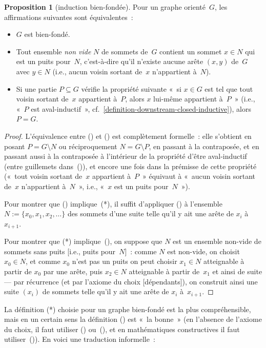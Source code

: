 \documentclass[12pt,a4paper]{article}
\theoremstyle{definition}
\newtheorem{prop}[comcnt]{Proposition}
\begin{document}
\begin{prop}[induction bien-fondée]\label{well-founded-induction}
Pour un graphe orienté $G$, les affirmations suivantes sont
équivalentes :

\begin{itemize}
\item[(*)]$G$ est bien-fondé.
\item[(\dag)]Tout ensemble \emph{non vide} $N$ de sommets de $G$
  contient un sommet $x \in N$ qui est un puits pour $N$,
  c'est-à-dire qu'il n'existe aucune arête $(x,y)$ de $G$ avec $y \in
  N$ (i.e., aucun voisin sortant de $x$ n'appartient à $N$).
\item[(\ddag)]Si une partie $P\subseteq G$ vérifie la propriété
  suivante « si $x \in G$ est tel que tout voisin sortant de $x$
    appartient à $P$, alors $x$ lui-même appartient à $P$ » (i.e.,
  « $P$ est aval-inductif »,
  cf. \ref{definition-downstream-closed-inductive}), alors $P = G$.
\end{itemize}
\end{prop}
\begin{proof}
L'équivalence entre (\dag) et (\ddag) est complètement formelle : elle
s'obtient en posant $P = G\setminus N$ ou réciproquement $N =
G\setminus P$, en passant à la contraposée, et en passant aussi à la
contraposée à l'intérieur de la propriété d'être aval-inductif (entre
guillemets dans (\ddag)), et encore une fois dans la prémisse de cette
propriété (« tout voisin sortant de $x$ appartient à $P$ » équivaut à
« aucun voisin sortant de $x$ n'appartient à $N$ », i.e., « $x$ est un
  puits pour $N$ »).

Pour montrer que (\dag) implique (*), il suffit d'appliquer (\dag) à
l'ensemble $N := \{x_0,x_1,x_2,\ldots\}$ des sommets d'une suite telle
qu'il y ait une arête de $x_i$ à $x_{i+1}$.

Pour montrer que (*) implique (\dag), on suppose que $N$ est un
ensemble non-vide de sommets sans puits [i.e., puits pour $N$] : comme
$N$ est non-vide, on choisit $x_0 \in N$, et comme $x_0$ n'est pas un
puits on peut choisir $x_1 \in N$ atteignable à partir de $x_0$ par
une arête, puis $x_2 \in N$ atteignable à partir de $x_1$ et ainsi de
suite — par récurrence (et par l'axiome du choix [dépendants]), on
construit ainsi une suite $(x_i)$ de sommets telle qu'il y ait une
arête de $x_i$ à $x_{i+1}$.
\end{proof}

La définition (*) choisie pour un graphe bien-fondé est la plus
compréhensible, mais en un certain sens la définition (\ddag) est « la
  bonne » (en l'absence de l'axiome du choix, il faut utiliser (\dag)
ou (\ddag), et en mathématiques constructives il faut
utiliser (\ddag)).  En voici une traduction informelle :
\end{document}

